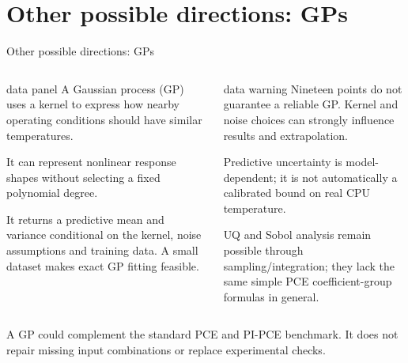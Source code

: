 \section{Other possible directions: GPs}

\begin{frame}{Other possible directions: GPs}
  \begin{columns}[T,onlytextwidth]
      \begin{beamercolorbox}[sep=2mm,wd=\linewidth]{data panel}
        \footnotesize
        A Gaussian process (GP) uses a kernel to express how nearby operating
        conditions should have similar temperatures.\par
        \smallskip
        It can represent nonlinear response shapes without selecting a fixed polynomial degree.\par
        \smallskip
        It returns a predictive mean and variance conditional on the kernel,
        noise assumptions and training data. A small dataset makes exact GP fitting feasible.
      \end{beamercolorbox}
      \begin{beamercolorbox}[sep=2mm,wd=\linewidth]{data warning}
        \footnotesize
        Nineteen points do not guarantee a reliable GP. Kernel and noise choices
        can strongly influence results and extrapolation.\par
        \smallskip
        Predictive uncertainty is model-dependent; it is not automatically a
        calibrated bound on real CPU temperature.\par
        \smallskip
        UQ and Sobol analysis remain possible through sampling/integration;
        they lack the same simple PCE coefficient-group formulas in general.
      \end{beamercolorbox}
  \end{columns}
  \medskip
  {\footnotesize
  A GP could complement the standard PCE and PI-PCE benchmark.
  It does not repair missing input combinations or replace experimental checks.
  }
\end{frame}

